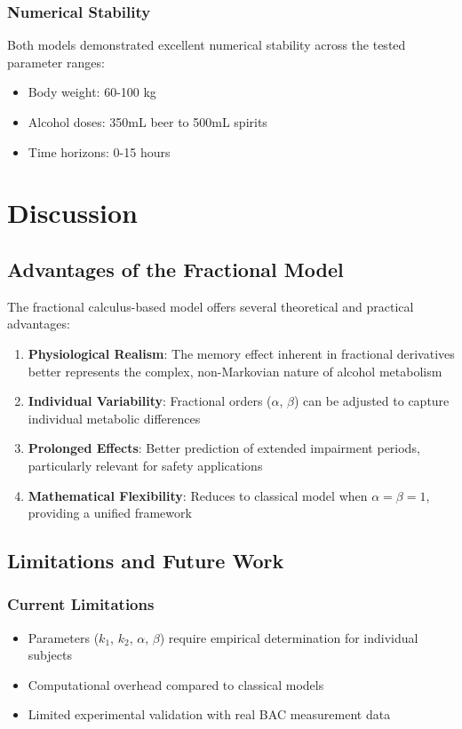 \documentclass[12pt]{article}
\begin{document}
\subsubsection{Numerical Stability}
Both models demonstrated excellent numerical stability across the tested parameter ranges:
\begin{itemize}
    \item Body weight: 60-100 kg
    \item Alcohol doses: 350mL beer to 500mL spirits
    \item Time horizons: 0-15 hours
\end{itemize}

\section{Discussion}

\subsection{Advantages of the Fractional Model}

The fractional calculus-based model offers several theoretical and practical advantages:

\begin{enumerate}
    \item \textbf{Physiological Realism}: The memory effect inherent in fractional derivatives better represents the complex, non-Markovian nature of alcohol metabolism
    
    \item \textbf{Individual Variability}: Fractional orders ($\alpha$, $\beta$) can be adjusted to capture individual metabolic differences
    
    \item \textbf{Prolonged Effects}: Better prediction of extended impairment periods, particularly relevant for safety applications
    
    \item \textbf{Mathematical Flexibility}: Reduces to classical model when $\alpha = \beta = 1$, providing a unified framework
\end{enumerate}

\subsection{Limitations and Future Work}

\subsubsection{Current Limitations}
\begin{itemize}
    \item Parameters ($k_1$, $k_2$, $\alpha$, $\beta$) require empirical determination for individual subjects
    \item Computational overhead compared to classical models
    \item Limited experimental validation with real BAC measurement data
\end{itemize}
\end{document}
